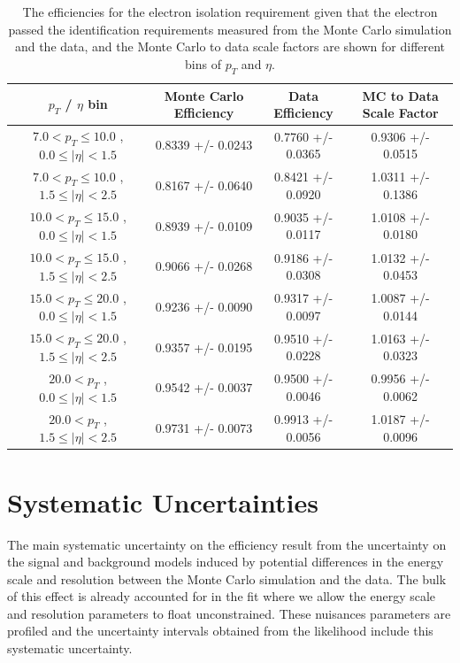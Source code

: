 \documentclass{cmspaper}
\begin{document}
 \begin{table}[!ht]
 \begin{center} 
 \begin{tabular}{|c|c|c|c|}
 \hline
 $p_{T}$ / $\eta$ bin    &  Monte Carlo Efficiency    &  Data Efficiency   &  MC to Data Scale Factor \\   \hline           
$  7.0 < p_{T} \le  10.0$ , $  0.0  \le |\eta| <   1.5$   &       0.8339 +/- 0.0243   &       0.7760 +/- 0.0365   &       0.9306 +/- 0.0515   \\   
\hline
$  7.0 < p_{T} \le  10.0$ , $  1.5  \le |\eta| <   2.5$   &       0.8167 +/- 0.0640   &       0.8421 +/- 0.0920   &       1.0311 +/- 0.1386   \\   
\hline
$ 10.0 < p_{T} \le  15.0$ , $  0.0  \le |\eta| <   1.5$   &       0.8939 +/- 0.0109   &       0.9035 +/- 0.0117   &       1.0108 +/- 0.0180   \\   
\hline
$ 10.0 < p_{T} \le  15.0$ , $  1.5  \le |\eta| <   2.5$   &       0.9066 +/- 0.0268   &       0.9186 +/- 0.0308   &       1.0132 +/- 0.0453   \\   
\hline
$ 15.0 < p_{T} \le  20.0$ , $  0.0  \le |\eta| <   1.5$   &       0.9236 +/- 0.0090   &       0.9317 +/- 0.0097   &       1.0087 +/- 0.0144   \\   
\hline
$ 15.0 < p_{T} \le  20.0$ , $  1.5  \le |\eta| <   2.5$   &       0.9357 +/- 0.0195   &       0.9510 +/- 0.0228   &       1.0163 +/- 0.0323   \\   
\hline
$ 20.0 < p_{T} $ , $  0.0  \le |\eta| <   1.5$   &       0.9542 +/- 0.0037   &       0.9500 +/- 0.0046   &       0.9956 +/- 0.0062   \\   
\hline
$ 20.0 < p_{T} $ , $  1.5  \le |\eta| <   2.5$   &       0.9731 +/- 0.0073   &       0.9913 +/- 0.0056   &       1.0187 +/- 0.0096   \\   
\hline
\end{tabular}
\caption{The efficiencies for the electron isolation requirement given that the electron passed the identification
  requirements measured from the Monte Carlo simulation and the data, and the Monte Carlo
  to data scale factors are shown for different bins of $p_{T}$ and $\eta$. }
\label{tab:Efficiency_HZZICHEP2012IsoGivenID}
\end{center}
\end{table}



\section{Systematic Uncertainties}
The main systematic uncertainty on the efficiency result from the uncertainty on the signal and 
background models induced by potential differences in the energy scale and resolution between
the Monte Carlo simulation and the data. The bulk of this effect is already accounted for 
in the fit where we allow the energy scale and resolution parameters to float unconstrained. 
These nuisances parameters are profiled and the uncertainty intervals obtained from the likelihood
include this systematic uncertainty. 
\end{document}
